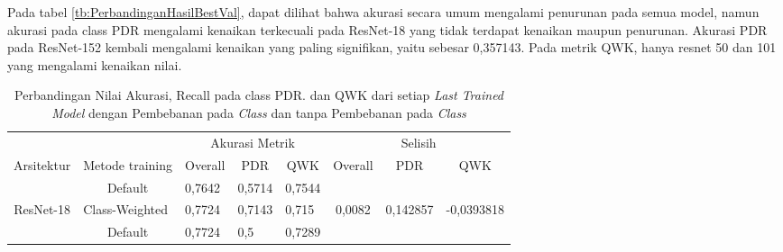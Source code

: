 Pada tabel \ref{tb:PerbandinganHasilBestVal}, dapat dilihat bahwa akurasi secara umum mengalami penurunan pada semua model, namun akurasi pada class PDR mengalami kenaikan terkecuali pada ResNet-18 yang tidak terdapat kenaikan maupun penurunan. Akurasi PDR pada ResNet-152 kembali mengalami kenaikan yang paling signifikan, yaitu sebesar 0,357143. Pada metrik QWK, hanya resnet 50 dan 101 yang mengalami kenaikan nilai.

\pagebreak
\begin{table}[hbtp]
\begin{center}
	\caption{Perbandingan Nilai Akurasi, Recall pada class PDR. dan QWK dari setiap \emph{Last Trained Model} dengan Pembebanan pada \emph{Class} dan tanpa Pembebanan pada \emph{Class}}
	\label{tb:PerbandinganHasilLastTrained}
	\begin{tabular}{|c|c|lll|ccc|}
		\hline
		\cellcolor[HTML]{C0C0C0}                             & \cellcolor[HTML]{C0C0C0}                                  & \multicolumn{3}{c|}{\cellcolor[HTML]{C0C0C0}Akurasi Metrik}                           & \multicolumn{3}{c|}{\cellcolor[HTML]{C0C0C0}Selisih}                                                                            \\ \cline{3-8} 
		\multirow{-2}{*}{\cellcolor[HTML]{C0C0C0}Arsitektur} & \multirow{-2}{*}{\cellcolor[HTML]{C0C0C0}Metode training} & \multicolumn{1}{c|}{Overall} & \multicolumn{1}{c|}{PDR}    & \multicolumn{1}{c|}{QWK} & \multicolumn{1}{c|}{Overall}                   & \multicolumn{1}{c|}{PDR}                        & QWK                          \\ \hline
															 & Default                                                   & \multicolumn{1}{l|}{0,7642}  & \multicolumn{1}{l|}{0,5714} & 0,7544                   & \multicolumn{1}{c|}{}                          & \multicolumn{1}{c|}{}                           &                              \\ \cline{2-5}
		\multirow{-2}{*}{ResNet-18}                          & \multicolumn{1}{l|}{Class-Weighted}                       & \multicolumn{1}{l|}{0,7724}  & \multicolumn{1}{l|}{0,7143} & 0,715                    & \multicolumn{1}{c|}{\multirow{-2}{*}{0,0082}}  & \multicolumn{1}{c|}{\multirow{-2}{*}{0,142857}} & \multirow{-2}{*}{-0,0393818} \\ \hline
															 & Default                                                   & \multicolumn{1}{l|}{0,7724}  & \multicolumn{1}{l|}{0,5}    & 0,7289                   & \multicolumn{1}{c|}{}                          & \multicolumn{1}{c|}{}                           &                              \\ \cline{2-5}

\end{tabular}
\end{center}
\end{table}
